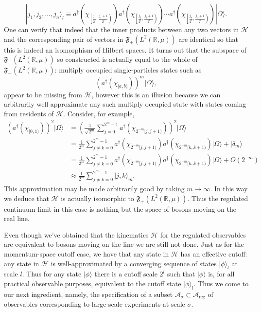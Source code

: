 \documentclass[11pt]{amsart}
\theoremstyle{plain}%
\theoremstyle{definition}
\theoremstyle{remark}
\begin{document}
\begin{equation}
	 |j_1,j_2, \ldots, j_n\rangle_l \equiv a^\dag\left(\chi_{\left[\frac{j_1}{2^l}, \frac{j_1+1}{2^l}\right)}\right)a^\dag\left(\chi_{\left[\frac{j_2}{2^l}, \frac{j_2+1}{2^l}\right)}\right)\cdots a^\dag\left(\chi_{\left[\frac{j_n}{2^l}, \frac{j_n+1}{2^l}\right)}\right)|\Omega\rangle.
\end{equation} 
One can verify that indeed that the inner products between any two vectors in $\mathcal{H}$ and the corresponding pair of vectors in $\mathfrak{F}_+(L^2(\mathbb{R}, \mu))$ are identical so that this is indeed an isomorphism of Hilbert spaces. It turns out that the subspace of $\mathfrak{F}_+(L^2(\mathbb{R}, \mu))$ so constructed is actually equal to the whole of $\mathfrak{F}_+(L^2(\mathbb{R}, \mu))$: multiply occupied single-particles states such as 
\begin{equation}
	(a^\dag(\chi_{[a,b)}))^m |\Omega\rangle,
\end{equation}
appear to be missing from $\mathcal{H}$, however this is an illusion because we can arbitrarily well approximate any such multiply occupied state with states coming from residents of $\mathcal{H}$. Consider, for example,
\begin{equation}
	\begin{split}
		(a^\dag(\chi_{[0,1)}))^2 |\Omega\rangle &= \left(\frac{1}{\sqrt{2^m}}\sum_{j=0}^{2^m -1} a^\dag(\chi_{2^{-m}[j,j+1)}) \right)^2|\Omega\rangle \\
		&= \frac{1}{{2^m}}\sum_{j\not=k=0}^{2^m -1} a^\dag(\chi_{2^{-m}[j,j+1)})a^\dag(\chi_{2^{-m}[k,k+1)})|\Omega\rangle + |\delta_m\rangle \\
		&= \frac{1}{{2^m}}\sum_{j\not=k=0}^{2^m -1} a^\dag(\chi_{2^{-m}[j,j+1)})a^\dag(\chi_{2^{-m}[k,k+1)})|\Omega\rangle + O(2^{-m}) \\
		&\approx \frac{1}{{2^m}}\sum_{j\not=k=0}^{2^m -1} |j,k\rangle_m.
	\end{split}
\end{equation}
This approximation may be made arbitrarily good by taking $m\rightarrow \infty$. In this way we deduce that $\mathcal{H}$ is actually isomorphic to $\mathfrak{F}_+(L^2(\mathbb{R}, \mu))$. Thus the regulated continuum limit in this case is nothing but the space of bosons moving on the real line. 

Even though we've obtained that the kinematics $\mathcal{H}$ for the regulated observables are equivalent to bosons moving on the line we are still not done. Just as for the momentum-space cutoff case, we have that any state in $\mathcal{H}$ has an effective cutoff: any state in $\mathcal{H}$ is well-approximated by a converging sequence of states $|\phi\rangle_l$ at scale $l$. Thus for any state $|\phi\rangle$ there is a cutoff scale $2^l$ such that $|\phi\rangle$ is, for all practical observable purposes, equivalent to the cutoff state $|\phi\rangle_l$. Thus we come to our next ingredient, namely, the specification of a subset $\mathcal{A}_\sigma \subset \mathcal{A}_{\text{reg}}$ of observables corresponding to large-scale experiments at scale $\sigma$. 
\end{document}
